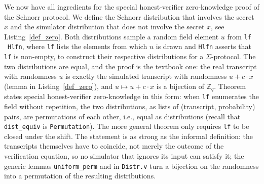 \documentclass[sigconf,anonymous,review]{acmart}
\begin{document}
  
We now have all ingredients for the special honest-verifier zero-knowledge proof of the Schnorr protocol. We define the 
Schnorr distribution \texttt{}
that involves the secret $x$ and 
the simulator distribution \texttt{}
that does not involve the secret $x$, see Listing~\ref{def_zero}. 
Both distributions sample a random field element $u$ from 
\texttt{} \texttt{lf} \ \texttt{Hlfn}, 
where \texttt{lf} lists the elements from which $u$ is drawn and 
\texttt{Hlfn} asserts that \texttt{lf} is non-empty, 
to construct their respective distributions for a $\Sigma$-protocol.
The two distributions are equal, and the proof is the textbook one: the real transcript with randomness $u$ is exactly the simulated transcript with randomness $u + c \cdot x$ (lemma \texttt{} in Listing~\ref{def_zero}), and $u \mapsto u + c \cdot x$ is a bijection of $\mathbb{Z}_q$. Theorem \texttt{} states special honest-verifier zero-knowledge in this form: when \texttt{lf} enumerates the field without repetition, the two distributions, as lists of (transcript, probability) pairs, are permutations of each other, i.e., equal as distributions (recall that \texttt{dist\_equiv} is \texttt{Permutation}). The more general theorem \texttt{} only requires \texttt{lf} to be closed under the shift. The statement is as strong as the informal definition: the transcripts themselves have to coincide, not merely the outcome of the verification equation, so no simulator that ignores its input can satisfy it; the generic lemmas \texttt{uniform\_perm} and \texttt{} in \texttt{Distr.v} turn a bijection on the randomness into a permutation of the resulting distributions.
\end{document}
